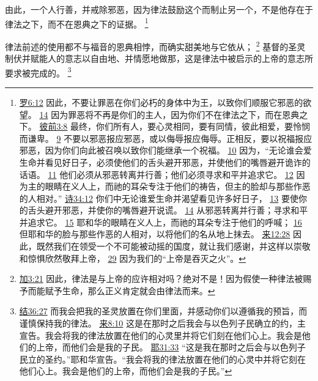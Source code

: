 \documentclass[12pt, a4paper, oneside]{ctexart}
\newcounter{parnum}[section]
\newcommand{\N}{%
   \noindent\refstepcounter{parnum}%
    \makebox[\parindent][l]{\textbf{\arabic{parnum}.}}}
\begin{document}
	由此，一个人行善，并戒除邪恶，因为律法鼓励这个而制止另一个，不是他存在于律法之下，而不在恩典之下的证据。
	\footnote {
		\href{https://biblehub.com/romans/6-12.htm}{罗6:12} 因此，不要让罪恶在你们必朽的身体中为王，以致你们顺服它邪恶的欲望。
		\href{https://biblehub.com/romans/6-14.htm}{14} 因为罪恶将不再是你们的主人，因为你们不在律法之下，而在恩典之下。
		\href{https://biblehub.com/1_peter/3-8.htm}{彼前3:8} 最终，你们所有人，要心灵相同，要有同情，彼此相爱，要怜悯而谦卑。
		\href{https://biblehub.com/1_peter/3-9.htm}{9} 不要以邪恶报应邪恶，或以侮辱报应侮辱。正相反，要以祝福报应邪恶，因为你们向此被召唤以致你们能继承一个祝福。
		\href{https://biblehub.com/1_peter/3-10.htm}{10} 因为，“无论谁会爱生命并看见好日子，必须使他们的舌头避开邪恶，并使他们的嘴唇避开诡诈的话语。
		\href{https://biblehub.com/1_peter/3-11.htm}{11} 他们必须从邪恶转离并行善；他们必须寻求和平并追求它。
		\href{https://biblehub.com/1_peter/3-12.htm}{12} 因为主的眼睛在义人上，而祂的耳朵专注于他们的祷告，但主的脸却与那些作恶的人相对。”
		\href{https://biblehub.com/psalms/34-12.htm}{诗34:12} 你们中无论谁爱生命并渴望看见许多好日子，
		\href{https://biblehub.com/psalms/34-13.htm}{13} 要使你的舌头避开邪恶，并使你的嘴唇避开说谎。
		\href{https://biblehub.com/psalms/34-14.htm}{14} 从邪恶转离并行善；寻求和平并追求它。
		\href{https://biblehub.com/psalms/34-15.htm}{15} 耶和华的眼睛在义人上，而祂的耳朵专注于他们的呼喊；
		\href{https://biblehub.com/psalms/34-16.htm}{16} 但耶和华的脸与那些作恶的人相对，以将他们的名从地上抹去。
		\href{https://biblehub.com/hebrews/12-28.htm}{来12:28} 因此，既然我们在领受一个不可能被动摇的国度，就让我们感谢，并这样以崇敬和惊惧欣然敬拜上帝，
		\href{https://biblehub.com/hebrews/12-29.htm}{29} 因为我们的“上帝是吞灭之火”。
	}

\N 律法前述的使用都不与福音的恩典相悖，而确实甜美地与它依从；
	\footnote {
		\href{https://biblehub.com/galatians/3-21.htm}{加3:21} 因此，律法是与上帝的应许相对吗？绝对不是！因为假使一种律法被赐予而能赋予生命，那么正义肯定就会由律法而来。
	}
	基督的圣灵制伏并赋能人的意志以自由地、并情愿地做那，这是律法中被启示的上帝的意志所要求被完成的。
	\footnote {
		\href{https://biblehub.com/ezekiel/36-27.htm}{结36:27} 而我会把我的圣灵放置在你们里面，并感动你们以遵循我的预旨，而谨慎保持我的律法。
		\href{https://biblehub.com/hebrews/8-10.htm}{来8:10} 这是在那时之后我会与以色列子民确立的约，主宣告。我会将我的律法放置在他们的心灵里并将它们刻在他们心上。我会是他们的上帝，而他们会是我的子民。
		\href{https://biblehub.com/jeremiah/31-33.htm}{耶31:33} “这是我在那时之后会与以色列子民立的圣约。”耶和华宣告。“我会将我的律法放置在他们的心灵中并将它刻在他们心上。我会是他们的上帝，而他们会是我的子民。”
	}
\end{document}
